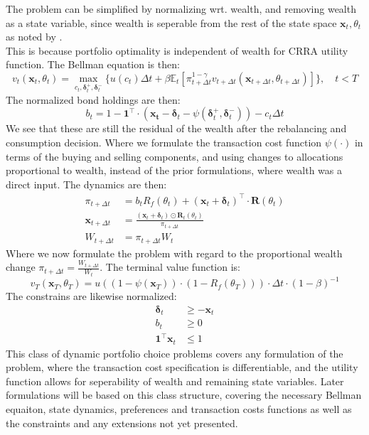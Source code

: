 \documentclass[11pt]{article}
\begin{document}
The problem can be simplified by normalizing wrt. wealth, and removing wealth as a state variable, since
wealth is seperable from the rest of the state space $\mathbf{x}_t , \theta_t$ as noted by \textcite{CaiJuddXu2013}.\\
This is because portfolio optimality is independent of wealth for CRRA utility function. 
The Bellman equation is then:
\begin{equation} \label{eq: class_bellman}
  v_{t} (\mathbf{x}_{t}, \theta_t) = \max_{c_t , \boldsymbol{\delta}^{+}_{t}, \boldsymbol{\delta}^{-}_{t} } \{ u(c_t) 
  \Delta t + \beta \mathbb{E}_{t} \left[ 
    \pi_{t+\Delta t}^{1-\gamma}
    v_{t+\Delta t} (\mathbf{x}_{t+\Delta t }, \theta_{t + \Delta t }  ) 
    \right] \} , \quad t < T 
\end{equation}
The normalized bond holdings are then:
\begin{equation}\label{eq: class_bond_holdings}
  b_{t} = 1 - \mathbf{1}^{\top} \cdot (\mathbf{x_t} - \boldsymbol{\delta}_t - \psi( \boldsymbol{\delta}^{+}_{t}, \boldsymbol{\delta}^{-}_{t}  )) - c_t \Delta t
\end{equation}
We see that these are still the residual of the wealth after the rebalancing and consumption decision.
Where we formulate the transaction cost function $\psi(\cdot)$ in terms of the buying and selling components,
and using changes to allocations proportional to wealth, instead of the prior formulations, where wealth was a direct input.
The dynamics are then:
\begin{align}
  \pi_{t+\Delta t} &= b_t R_f (\theta_t)  + (\mathbf{x}_t + \boldsymbol{\delta}_t)^{\top} \cdot \mathbf{R}(\theta_t) \\
  \mathbf{x}_{t+\Delta t} &=  \frac{(\mathbf{x}_t + \boldsymbol{\delta}_t) \odot \mathbf{R}_t (\theta_t )}{ \pi_{t+\Delta t} } \\
  W_{t+\Delta t} &= \pi_{t+\Delta t} W_t
\end{align}
Where we now formulate the problem with regard to the proportional wealth change $\pi_{t+\Delta t} = \frac{W_{t+\Delta t}}{W_t}$.
The terminal value function is:
\begin{equation} \label{eq: class_terminal_value}
  v_T (\mathbf{x}_T , \theta_T ) = u ( (1 - \psi(\mathbf{x}_T)) \cdot (1-R_f (\theta_T)) )\cdot \Delta t \cdot (1-\beta)^{-1} 
\end{equation}
The constrains are likewise normalized:
\begin{align}
  \boldsymbol{\delta}_t &\geq - \mathbf{x}_t \label{eq: No_Short_risky} \\
  b_t &\geq 0 \label{eq: No_Short_bonds}\\
  \mathbf{1}^{\top} \mathbf{x}_t &\leq 1 \label{eq: No_Geared_Risky}
\end{align}
This class of dynamic portfolio choice problems covers any formulation of the problem,
where the transaction cost specification is differentiable, and the utility function allows for seperability of wealth and remaining state variables.
Later formulations will be based on this class structure, covering the necessary Bellman equaiton, state dynamics, preferences and transaction costs functions as well as the constraints
and any extensions not yet presented.
\end{document}
